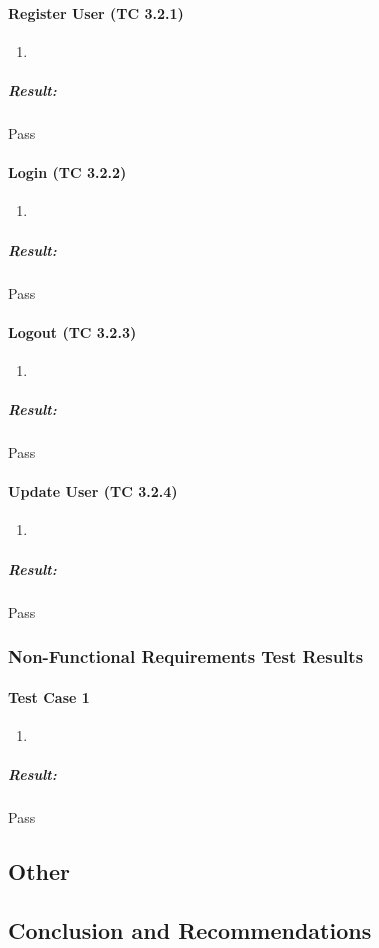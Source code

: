 \documentclass{article}
\begin{document}
			\paragraph{Register User (TC 3.2.1)}
				\begin{enumerate}
					\item 
				\end{enumerate}
				\subparagraph{Result: } Pass
			
			\paragraph{Login (TC 3.2.2)}
				\begin{enumerate}
					\item 
				\end{enumerate}
				\subparagraph{Result: } Pass
			
			\paragraph{Logout (TC 3.2.3)}
				\begin{enumerate}
					\item 
				\end{enumerate}
				\subparagraph{Result: } Pass
			
			\paragraph{Update User (TC 3.2.4)}
				\begin{enumerate}
					\item 
				\end{enumerate}
				\subparagraph{Result: } Pass
			
		\subsubsection{Non-Functional Requirements Test Results}
			\paragraph{Test Case 1}
				\begin{enumerate}
					\item 
				\end{enumerate}
				\subparagraph{Result: } Pass
	\subsection{Other}
	\subsection{Conclusion and Recommendations}
\end{document}
